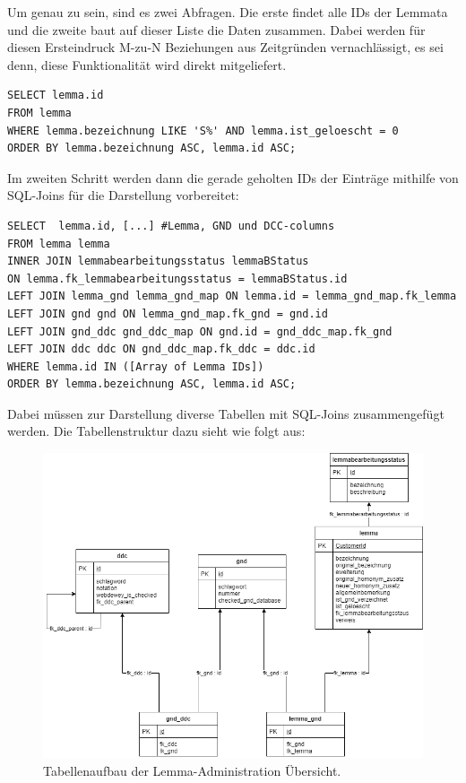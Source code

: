 \newpage

Um genau zu sein, sind es zwei Abfragen. Die erste findet alle IDs der Lemmata und die zweite baut auf dieser Liste die Daten zusammen. 
Dabei werden für diesen Ersteindruck M-zu-N Beziehungen aus Zeitgründen vernachlässigt, es sei denn, diese Funktionalität wird direkt mitgeliefert.

\lstset{language=SQL}
\begin{lstlisting}[frame=single, caption=Abfrage aller Lemmata mit den Buchstaben S (Part 1),captionpos=b] 
SELECT lemma.id
FROM lemma
WHERE lemma.bezeichnung LIKE 'S%' AND lemma.ist_geloescht = 0
ORDER BY lemma.bezeichnung ASC, lemma.id ASC;
\end{lstlisting}

Im zweiten Schritt werden dann die gerade geholten IDs der Einträge mithilfe von SQL-Joins für die Darstellung vorbereitet:

\lstset{language=SQL}
\begin{lstlisting}[frame=single, label={lst:sqlQuery}, caption=Abfrage aller Lemmata mit den Buchstaben S (Part 2),captionpos=b] 
SELECT  lemma.id, [...] #Lemma, GND und DCC-columns        
FROM lemma lemma
INNER JOIN lemmabearbeitungsstatus lemmaBStatus
ON lemma.fk_lemmabearbeitungsstatus = lemmaBStatus.id
LEFT JOIN lemma_gnd lemma_gnd_map ON lemma.id = lemma_gnd_map.fk_lemma
LEFT JOIN gnd gnd ON lemma_gnd_map.fk_gnd = gnd.id
LEFT JOIN gnd_ddc gnd_ddc_map ON gnd.id = gnd_ddc_map.fk_gnd
LEFT JOIN ddc ddc ON gnd_ddc_map.fk_ddc = ddc.id
WHERE lemma.id IN ([Array of Lemma IDs])
ORDER BY lemma.bezeichnung ASC, lemma.id ASC;
\end{lstlisting}

Dabei müssen zur Darstellung diverse Tabellen mit SQL-Joins zusammengefügt werden.
Die Tabellenstruktur dazu sieht wie folgt aus:

\begin{figure}
	\centering
	\includegraphics[width=0.8\linewidth]{images/structure_lemmaadministration.png}
	\caption{Tabellenaufbau der Lemma-Administration Übersicht.}
	\label{img:lAdminStructure}
\end{figure}

\newpage